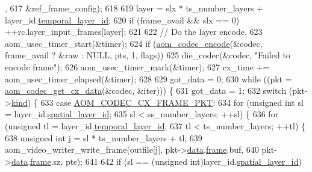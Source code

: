 \begin{DoxyCodeInclude}
{{{{{{{{{{{{{{{{{{      ,
617                           &ref\_frame\_config);
618 
619       layer = slx * ts\_number\_layers + layer\_id.\hyperlink{structaom__svc__layer__id_a9a28c1b126e8d1fdda6e1d881afb66fb}{temporal\_layer\_id};
620       \textcolor{keywordflow}{if} (frame\_avail && slx == 0) ++rc.layer\_input\_frames[layer];
621 
622       \textcolor{comment}{// Do the layer encode.}
623       aom\_usec\_timer\_start(&timer);
624       \textcolor{keywordflow}{if} (\hyperlink{group__encoder_ga6f4a777de5389771e783df7ff1f116d4}{aom\_codec\_encode}(&codec, frame\_avail ? &raw : NULL, pts, 1, flags))
625         die\_codec(&codec, \textcolor{stringliteral}{"Failed to encode frame"});
626       aom\_usec\_timer\_mark(&timer);
627       cx\_time += aom\_usec\_timer\_elapsed(&timer);
628 
629       got\_data = 0;
630       \textcolor{keywordflow}{while} ((pkt = \hyperlink{group__encoder_gaedc4c56b60d4217677cb561066360884}{aom\_codec\_get\_cx\_data}(&codec, &iter))) \{
631         got\_data = 1;
632         \textcolor{keywordflow}{switch} (pkt->\hyperlink{structaom__codec__cx__pkt_a11e586120c689ece9a7690e72ff384be}{kind}) \{
633           \textcolor{keywordflow}{case} \hyperlink{group__encoder_ggafeb69da4a9649a54e805f59c26d8dfeda793165d0f219812342f69d5fd9b2b9c8}{AOM\_CODEC\_CX\_FRAME\_PKT}:
634             \textcolor{keywordflow}{for} (\textcolor{keywordtype}{unsigned} \textcolor{keywordtype}{int} sl = layer\_id.\hyperlink{structaom__svc__layer__id_af018f2e9cc472827a75b92a78ba6ee4e}{spatial\_layer\_id};
635                  sl < ss\_number\_layers; ++sl) \{
636               \textcolor{keywordflow}{for} (\textcolor{keywordtype}{unsigned} tl = layer\_id.\hyperlink{structaom__svc__layer__id_a9a28c1b126e8d1fdda6e1d881afb66fb}{temporal\_layer\_id};
637                    tl < ts\_number\_layers; ++tl) \{
638                 \textcolor{keywordtype}{unsigned} \textcolor{keywordtype}{int} j = sl * ts\_number\_layers + tl;
639                 aom\_video\_writer\_write\_frame(outfile[j], pkt->\hyperlink{structaom__codec__cx__pkt_afb379cd4bfa7692d1d6e85f4e4b2b410}{data}.\hyperlink{structaom__codec__cx__pkt_a4180a6ae59b0d295bc915d4689df4cb0}{frame}.buf,
640                                              pkt->\hyperlink{structaom__codec__cx__pkt_afb379cd4bfa7692d1d6e85f4e4b2b410}{data}.\hyperlink{structaom__codec__cx__pkt_a4180a6ae59b0d295bc915d4689df4cb0}{frame}.sz, pts);
641 
642                 \textcolor{keywordflow}{if} (sl == (\textcolor{keywordtype}{unsigned} \textcolor{keywordtype}{int})layer\_id.\hyperlink{structaom__svc__layer__id_af018f2e9cc472827a75b92a78ba6ee4e}{spatial\_layer\_id})
}}}}}}}}}}}}}}}}}}
\end{DoxyCodeInclude}
